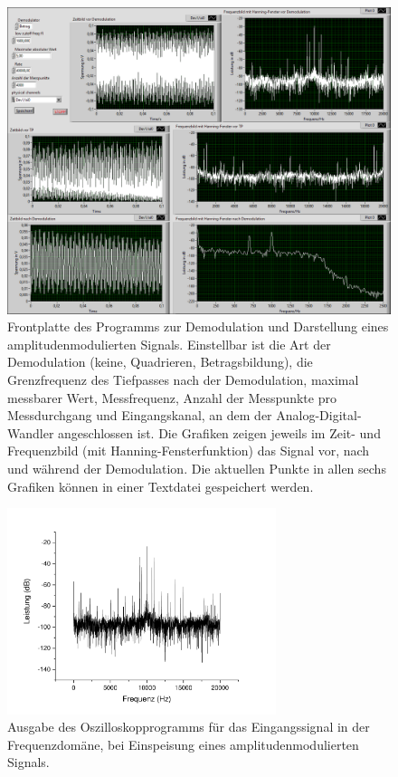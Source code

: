 \documentclass[
a4paper,
12pt,
pagesize,
ngerman
]{scrartcl}
\begin{document}
	\begin{figure}[H]  
		\includegraphics[width=1\textwidth]{EIRE2018Dateien/Tag3/modifizierterOszi/Oszilloskop__modifiziertp}
		\centering
		\caption{
			Frontplatte des Programms zur Demodulation und Darstellung eines amplitudenmodulierten Signals.
			Einstellbar ist die Art der Demodulation (keine, Quadrieren, Betragsbildung), die Grenzfrequenz des Tiefpasses nach der Demodulation, maximal messbarer Wert, Messfrequenz, Anzahl der Messpunkte pro Messdurchgang und Eingangskanal, an dem der Analog-Digital-Wandler angeschlossen ist.
			Die Grafiken zeigen jeweils im Zeit- und Frequenzbild (mit Hanning-Fensterfunktion) das Signal vor, nach und während der Demodulation.
			Die aktuellen Punkte in allen sechs Grafiken können in einer Textdatei gespeichert werden.
		}
		\label{fig_tag3_am_demod_front}
	\centering
	\end{figure}


	\begin{figure}[H]  
		\includegraphics[width=0.7\textwidth]{Origin-Files/AM-Demod-Betrag-Eingang}
		\centering
		\caption{Ausgabe des Oszilloskopprogramms für das Eingangssignal in der Frequenzdomäne, bei Einspeisung eines amplitudenmodulierten Signals. %
			}
		\label{fig_tag3_am_demod_eingang}
		\centering
	\end{figure}
\end{document}
